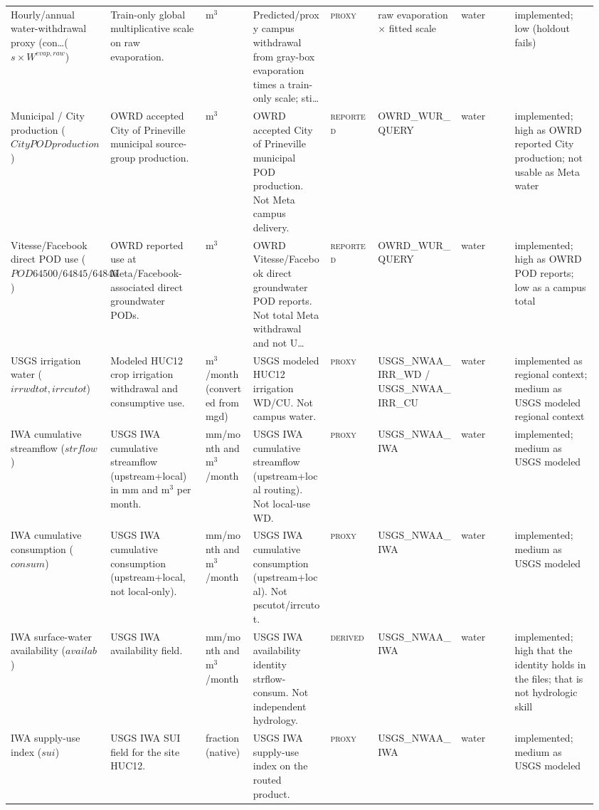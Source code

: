 \documentclass[11pt]{article}
\newcommand{\Reported}{\textsc{reported}}
\newcommand{\Derived}{\textsc{derived}}
\newcommand{\Proxy}{\textsc{proxy}}
\begin{document}
\begin{longtable}{@{}p{0.14\linewidth}p{0.16\linewidth}p{0.08\linewidth}p{0.13\linewidth}p{0.08\linewidth}p{0.14\linewidth}p{0.09\linewidth}p{0.14\linewidth}@{}}
Hourly/annual water-withdrawal proxy (con\ldots ($s \times W^{evap,raw}$) & Train-only global multiplicative scale on raw evaporation. & m$^{3}$ & Predicted/proxy campus withdrawal from gray-box evaporation times a train-only scale; sti\ldots & \Proxy{} & raw evaporation $\times$ fitted scale & water & implemented; low (holdout fails)\\
Municipal / City production ($City POD production$) & OWRD accepted City of Prineville municipal source-group production. & m$^{3}$ & OWRD accepted City of Prineville municipal POD production. Not Meta campus delivery. & \Reported{} & OWRD\_WUR\_QUERY & water & implemented; high as OWRD reported City production; not usable as Meta water\\
Vitesse/Facebook direct POD use ($POD 64500/64845/64846$) & OWRD reported use at Meta/Facebook-associated direct groundwater PODs. & m$^{3}$ & OWRD Vitesse/Facebook direct groundwater POD reports. Not total Meta withdrawal and not U\ldots & \Reported{} & OWRD\_WUR\_QUERY & water & implemented; high as OWRD POD reports; low as a campus total\\
USGS irrigation water ($irrwdtot, irrcutot$) & Modeled HUC12 crop irrigation withdrawal and consumptive use. & m$^{3}$/month (converted from mgd) & USGS modeled HUC12 irrigation WD/CU. Not campus water. & \Proxy{} & USGS\_NWAA\_IRR\_WD / USGS\_NWAA\_IRR\_CU & water & implemented as regional context; medium as USGS modeled regional context\\
IWA cumulative streamflow ($strflow$) & USGS IWA cumulative streamflow (upstream+local) in mm and m$^{3}$ per month. & mm/month and m$^{3}$/month & USGS IWA cumulative streamflow (upstream+local routing). Not local-use WD. & \Proxy{} & USGS\_NWAA\_IWA & water & implemented; medium as USGS modeled\\
IWA cumulative consumption ($consum$) & USGS IWA cumulative consumption (upstream+local, not local-only). & mm/month and m$^{3}$/month & USGS IWA cumulative consumption (upstream+local). Not pscutot/irrcutot. & \Proxy{} & USGS\_NWAA\_IWA & water & implemented; medium as USGS modeled\\
IWA surface-water availability ($availab$) & USGS IWA availability field. & mm/month and m$^{3}$/month & USGS IWA availability identity strflow-consum. Not independent hydrology. & \Derived{} & USGS\_NWAA\_IWA & water & implemented; high that the identity holds in the files; that is not hydrologic skill\\
IWA supply-use index ($sui$) & USGS IWA SUI field for the site HUC12. & fraction (native) & USGS IWA supply-use index on the routed product. & \Proxy{} & USGS\_NWAA\_IWA & water & implemented; medium as USGS modeled\\

\end{longtable}
\end{document}

